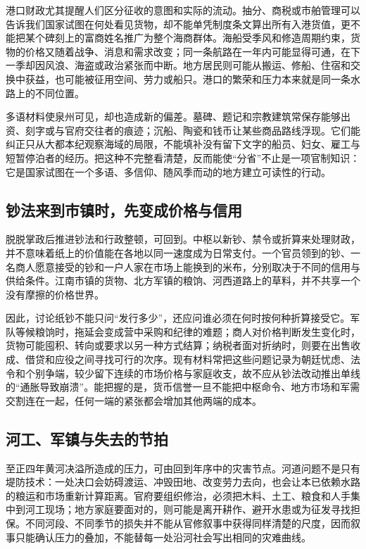 港口财政尤其提醒人们区分征收的意图和实际的流动。抽分、商税或市舶管理可以告诉我们国家试图在何处看见货物，却不能单凭制度条文算出所有入港货值，更不能把某个碑刻上的富商姓名推广为整个海商群体。海船受季风和修造周期约束，货物的价格又随着战争、消息和需求改变；同一条航路在一年内可能显得可通，在下一季却因风浪、海盗或政治紧张而中断。地方居民则可能从搬运、修船、住宿和交换中获益，也可能被征用空间、劳力或船只。港口的繁荣和压力本来就是同一条水路上的不同位置。

多语材料使泉州可见，却也造成新的偏差。墓碑、题记和宗教建筑常保存能够出资、刻字或与官府交往者的痕迹；沉船、陶瓷和钱币让某些商品路线浮现。它们能纠正只从大都本纪观察海域的局限，不能填补没有留下文字的船员、妇女、雇工与短暂停泊者的经历。把这种不完整看清楚，反而能使“分省”不止是一项官制知识：它是国家试图在一个多语、多信仰、随风季而动的地方建立可读性的行动。

\subsection{钞法来到市镇时，先变成价格与信用}

脱脱掌政后推进钞法和行政整顿，可回到。中枢以新钞、禁令或折算来处理财政，并不意味着纸上的价值能在各地以同一速度成为日常支付。一个官员领到的钞、一名商人愿意接受的钞和一户人家在市场上能换到的米布，分别取决于不同的信用与供给条件。江南市镇的货物、北方军镇的粮饷、河西道路上的草料，并不共享一个没有摩擦的价格世界。

因此，讨论纸钞不能只问“发行多少”，还应问谁必须在何时按何种折算接受它。军队等候粮饷时，拖延会变成营中采购和纪律的难题；商人对价格判断发生变化时，货物可能囤积、转向或要求以另一种方式结算；纳税者面对折纳时，则要在出售收成、借贷和应役之间寻找可行的次序。现有材料常把这些问题记录为朝廷忧虑、法令和个别争端，较少留下连续的市场价格与家庭收支，故不应从钞法改动推出单线的“通胀导致崩溃”。能把握的是，货币信誉一旦不能把中枢命令、地方市场和军需交割连在一起，任何一端的紧张都会增加其他两端的成本。

\subsection{河工、军镇与失去的节拍}

至正四年黄河决溢所造成的压力，可由回到年序中的灾害节点。河道问题不是只有堤防技术：一处决口会妨碍渡运、冲毁田地、改变劳力去向，也会让本已依赖水路的粮运和市场重新计算距离。官府要组织修治，必须把木料、土工、粮食和人手集中到河工现场；地方家庭要面对的，则可能是离开耕作、避开水患或为征发寻找担保。不同河段、不同季节的损失并不能从官修叙事中获得同样清楚的尺度，因而叙事只能确认压力的叠加，不能替每一处沿河社会写出相同的灾难曲线。

